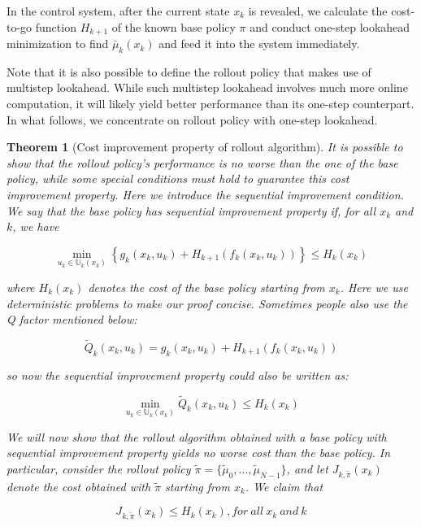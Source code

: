 \documentclass[
]{book}
\newtheorem{theorem}{Theorem}[chapter]
\theoremstyle{definition}
\theoremstyle{definition}
\theoremstyle{definition}
\theoremstyle{definition}
\theoremstyle{remark}
\begin{document}
In the control system, after the current state \(x_k\) is revealed, we calculate the cost-to-go function \(H_{k+1}\) of the known base policy \(\pi\) and conduct one-step lookahead minimization to find \(\bar\mu_k(x_k)\) and feed it into the system immediately.

Note that it is also possible to define the rollout policy that makes use of multistep lookahead. While such multistep lookahead involves much more online computation, it will likely yield better performance than its one-step counterpart. In what follows, we concentrate on rollout policy with one-step lookahead.

\begin{theorem}[Cost improvement property of rollout algorithm]
\protect\hypertarget{thm:cost-improvement}{}\label{thm:cost-improvement}It is possible to show that the rollout policy's performance is no worse than the one of the base policy, while some special conditions must hold to guarantee this cost improvement property. Here we introduce the \emph{sequential improvement} condition. We say that the base policy has sequential improvement property if, for all \(x_k\) and \(k\), we have

\begin{equation}
\min_{u_k \in \mathbb U_k(x_k)} \left\{g_k(x_k,u_k)+H_{k+1}(f_k(x_k,u_k))\right\} \leq H_k(x_k)
\end{equation}

where \(H_k(x_k)\) denotes the cost of the base policy starting from \(x_k\). Here we use deterministic problems to make our proof concise. Sometimes people also use the \emph{Q factor} mentioned below:

\begin{equation}
\tilde Q_k(x_k,u_k) = g_k(x_k,u_k)+H_{k+1}(f_k(x_k,u_k))
\end{equation}

so now the sequential improvement property could also be written as:

\begin{equation}
\min_{u_k \in \mathbb U_k(x_k)} \tilde Q_k(x_k,u_k) \leq H_k(x_k)
\end{equation}

We will now show that the rollout algorithm obtained with a base policy with sequential improvement property yields no worse cost than the base policy. In particular, consider the rollout policy \(\tilde \pi = \{\tilde \mu_0, ..., \tilde \mu_{N-1}\}\), and let \(J_{k, \tilde \pi} (x_k)\) denote the cost obtained with \(\tilde \pi\) starting from \(x_k\). We claim that

\begin{equation}
J_{k,\tilde \pi} (x_k) \leq H_k(x_k), for \ all \ x_k \ and \ k \label{eq:apprinv-cost-improvement}
\end{equation}
\end{theorem}
\end{document}
